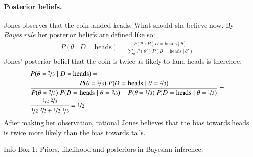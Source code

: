 \documentclass[nobib]{tufte-handout}
\begin{document}
\begin{InfoBox}[t]
{\begin{minipage}{1.0\textwidth}
    \paragraph{Posterior beliefs.} Jones observes that the coin landed heads. What should she
    believe now. By \emph{Bayes rule} her posterior beliefs are defined like so:
    \begin{align*}
      P(\theta \mid D = \text{heads}) = \frac{P(\theta) P(D = \text{heads} \mid \theta)}{\sum_{\theta'}P(\theta') P(D = \text{heads} \mid \theta')}
    \end{align*}
    Jones' posterior belief that the coin is twice as likely to land heads is therefore:
    \begin{align*}
      & P(\theta = \nicefrac{2}{3} \mid D = \text{heads}) =  \\
      & \frac{P(\theta = \nicefrac{2}{3}) \ P(D = \text{heads} \mid \theta = \nicefrac{2}{3})}{P(\theta = \nicefrac{2}{3}) \ P(D = \text{heads} \mid \theta = \nicefrac{2}{3}) + P(\theta = \nicefrac{1}{3}) \ P(D = \text{heads} \mid \theta = \nicefrac{1}{3})} = \\
      & \frac{\nicefrac{1}{2} \ \nicefrac{2}{3}}{\nicefrac{1}{2} \ \nicefrac{2}{3} + \nicefrac{1}{2} \ \nicefrac{1}{3}} = \nicefrac{1}{2}
    \end{align*}
    After making her observation, rational Jones believes that the bias towards heads is twice
    more likely than the bias towards tails.
    
  \end{minipage} \par
  } \par
  \begin{center}
    Info Box 1: Priors, likelihood and posteriors in Bayesian inference.
  \end{center}
\end{InfoBox}






\printbibliography[heading=bibintoc]
\end{document}
